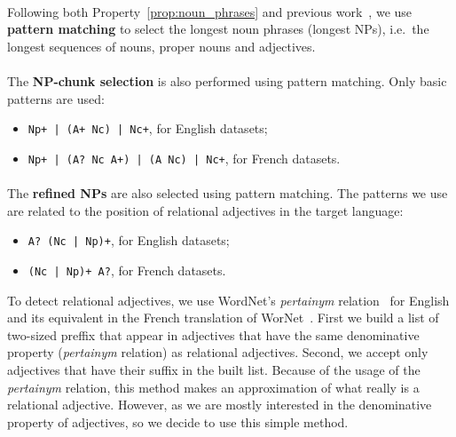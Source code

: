       \paragraph{}
      Following both Property~\ref{prop:noun_phrases} and previous
      work~\cite{hassan2010conundrums}, we use \textbf{pattern matching} to
      select the longest noun phrases (longest NPs), i.e.~the longest sequences
      of nouns, proper nouns and adjectives.

      \paragraph{}
      The \textbf{NP-chunk selection} is also performed using pattern matching.
      Only basic patterns are used:
      \begin{itemize}
        \item{\verb:Np+ | (A+ Nc) | Nc+:, for English datasets;}
        \item{\verb:Np+ | (A? Nc A+) | (A Nc) | Nc+:, for French datasets.}
      \end{itemize}

      \paragraph{}
      The \textbf{refined NPs} are also selected using pattern matching. The
      patterns we use are related to the position of relational adjectives in
      the target language:
      \begin{itemize}
        \item{\verb:A? (Nc | Np)+:, for English datasets;}
        \item{\verb:(Nc | Np)+ A?:, for French datasets.}
      \end{itemize}
      To detect relational adjectives, we use WordNet's \textit{pertainym}
      relation~\cite{miller1995wordnet} for English and its equivalent in the
      French translation of WorNet~\cite[WoNeF]{pradet2013wonef}. First we build
      a list of two-sized preffix that appear in adjectives that have the same
      denominative property (\textit{pertainym} relation) as relational
      adjectives. Second, we accept only adjectives that have their suffix in
      the built list. Because of the usage of the \textit{pertainym} relation,
      this method makes an approximation of what really is a relational
      adjective. However, as we are mostly interested in the denominative
      property of adjectives, so we decide to use this simple method.

